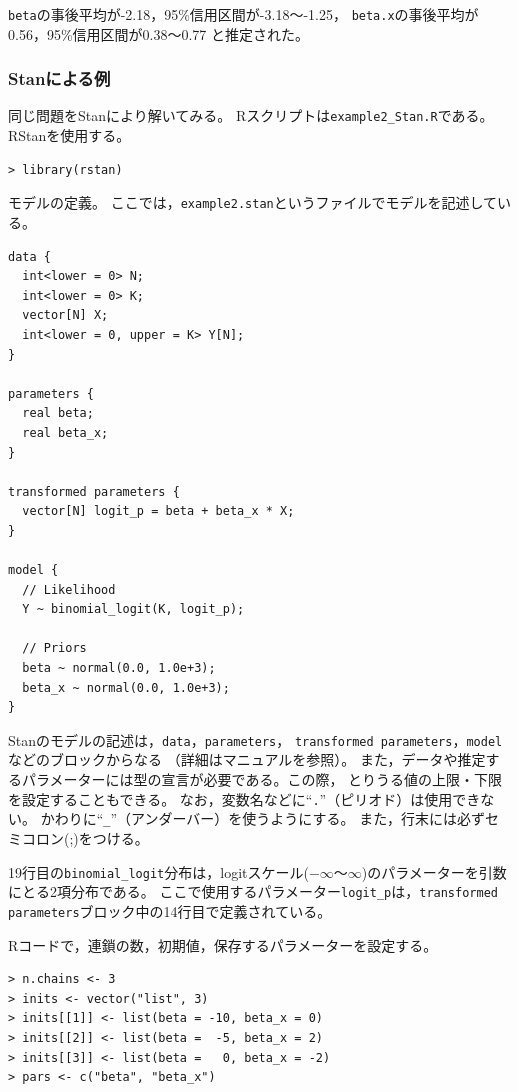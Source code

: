 \documentclass[11pt,uplatex]{jsarticle}
\begin{document}
\noindent
\texttt{beta}の事後平均が-2.18，95\%信用区間が-3.18〜-1.25，
\texttt{beta.x}の事後平均が0.56，95\%信用区間が0.38〜0.77
と推定された。


\subsubsection{Stanによる例}
同じ問題を\textsf{Stan}により解いてみる。
\textsf{R}スクリプトは\texttt{example2\_Stan.R}である。
RStanを使用する。
%
\begin{lstlisting}
> library(rstan)
\end{lstlisting}

モデルの定義。
ここでは，\texttt{example2.stan}というファイルでモデルを記述している。
%
\begin{lstlisting}
data {
  int<lower = 0> N;
  int<lower = 0> K;
  vector[N] X;
  int<lower = 0, upper = K> Y[N];
}

parameters {
  real beta;
  real beta_x;
}

transformed parameters {
  vector[N] logit_p = beta + beta_x * X;
}

model {
  // Likelihood
  Y ~ binomial_logit(K, logit_p);

  // Priors
  beta ~ normal(0.0, 1.0e+3);
  beta_x ~ normal(0.0, 1.0e+3);
}
\end{lstlisting}
\noindent
Stanのモデルの記述は，\texttt{data}，\texttt{parameters}，
\texttt{transformed parameters}，\texttt{model}などのブロックからなる
（詳細はマニュアルを参照）。
また，データや推定するパラメーターには型の宣言が必要である。この際，
とりうる値の上限・下限を設定することもできる。
なお，変数名などに``\texttt{.}''（ピリオド）は使用できない。
かわりに``\texttt{\_}''（アンダーバー）を使うようにする。
また，行末には必ずセミコロン(;)をつける。

19行目の\texttt{binomial\_logit}分布は，logitスケール($-\infty$〜$\infty$)のパラメーターを引数にとる2項分布である。
ここで使用するパラメーター\texttt{logit\_p}は，\texttt{transformed parameters}ブロック中の14行目で定義されている。

\textsf{R}コードで，連鎖の数，初期値，保存するパラメーターを設定する。
\begin{lstlisting}
> n.chains <- 3
> inits <- vector("list", 3)
> inits[[1]] <- list(beta = -10, beta_x = 0)
> inits[[2]] <- list(beta =  -5, beta_x = 2)
> inits[[3]] <- list(beta =   0, beta_x = -2)
> pars <- c("beta", "beta_x")
\end{lstlisting}
\end{document}
